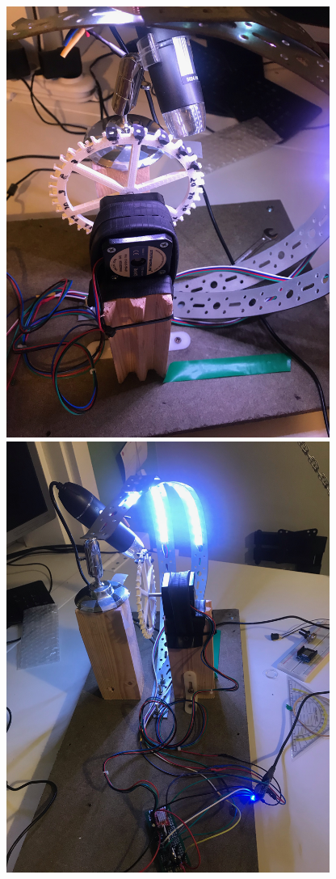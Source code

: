 \documentclass{scrartcl}
\begin{document}
\includegraphics[width=4.166667in, keepaspectratio=true]{./Masterproef_Tool_Wear_Inspection_-_Update_4_TG/rechts_licht.jpeg}\includegraphics[width=4.166667in, keepaspectratio=true]{./Masterproef_Tool_Wear_Inspection_-_Update_4_TG/achter_licht.jpeg}
\end{document}
